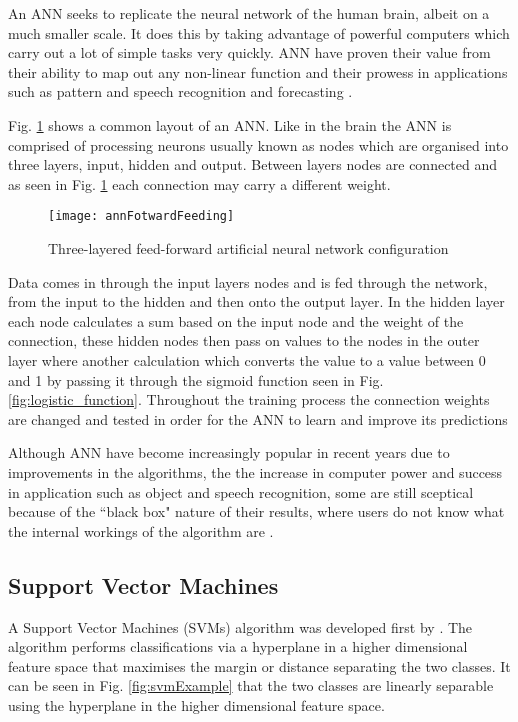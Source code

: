 An ANN seeks to replicate the neural network of the human brain, albeit on a much smaller scale. It does this by taking advantage of powerful computers which carry out a lot of simple tasks very quickly. ANN have proven their value from their ability to map out any non-linear function \citep{white_learning_1989} and their prowess in applications such as pattern and speech recognition and forecasting \citep{kaastra_forecasting_1995}.

Fig. \ref{fig:annFotwardFeeding} shows a common layout of an ANN. Like in the brain the ANN is comprised of processing neurons usually known as nodes which are organised into three layers, input, hidden and output. Between layers nodes are connected and as seen in Fig. \ref{fig:annFotwardFeeding} each connection may carry a different weight.

\begin{figure}[H]
	\texttt{[image: annFotwardFeeding]}
	\caption{Three-layered feed-forward artificial neural network configuration \\
				\cite[Source:][]{raju_development_2011}
			}
	\label{fig:annFotwardFeeding}
\end{figure}

Data comes in through the input layers nodes and is fed through the network, from the input to the hidden and then onto the output layer. In the hidden layer each node calculates a sum based on the input node and the weight of the connection, these hidden nodes then pass on values to the nodes in the outer layer where another calculation which converts the value to a value between 0 and 1 by passing it through the sigmoid function seen in Fig. \ref{fig:logistic_function}. Throughout the training process the connection weights are changed and tested in order for the ANN to learn and improve its predictions \citep{haykin_neural_1998}

Although ANN have become increasingly popular in recent years due to improvements in the algorithms, the the increase in computer power and success in application such as object and speech recognition,  some are still sceptical because of the ``black box" nature of their results, where users do not know what the internal workings of the algorithm are  \citep{kaastra_forecasting_1995}. 



\subsection{Support Vector Machines} \label{SVM}
A Support Vector Machines (SVMs) algorithm was developed first by \cite{vapnik_nature_1995}. The algorithm performs classifications via a hyperplane in a higher dimensional feature space that maximises the margin or distance separating the two classes. It can be seen in Fig. \ref{fig:svmExample} that the two classes are linearly separable using the hyperplane in the higher dimensional feature space. 

